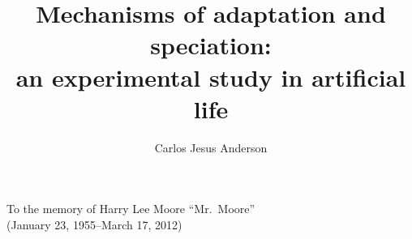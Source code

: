 \documentclass{msuphddissertation}
\title{Mechanisms of adaptation and speciation:\protect\\
  an experimental study in artificial life}
\author{Carlos Jesus Anderson}
\begin{document}
\maketitlepage



\begin{copyrt}
\centering
\end{copyrt}

\begin{dedication} 
\centering To the memory of Harry Lee Moore ``Mr.\ Moore''\\
  (January 23, 1955--March 17, 2012)
\end{dedication}



\TOC
\LOT
\LOF

\newpage
{}










\end{document}
